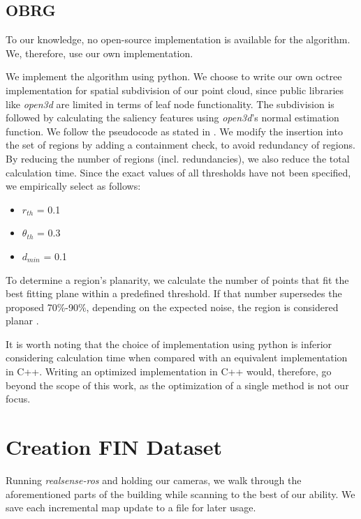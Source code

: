 \documentclass[main.tex]{subfiles}
\begin{document}
\subsection{OBRG}
To our knowledge, no open-source implementation is available for the algorithm.
We, therefore, use our own implementation.

We implement the algorithm using python. We choose to write our own octree implementation for spatial subdivision of our point cloud, since
public libraries like \textit{open3d} are limited in terms of leaf node functionality.
The subdivision is followed by calculating the saliency features using \textit{open3d}'s normal estimation function.
We follow the pseudocode as stated in \cite[Algorithm~1]{Vo_Truong-Hong_Laefer_Bertolotto_2015}. We modify the insertion into the set
of regions by adding a containment check, to avoid redundancy of regions. By reducing the number of regions (incl. redundancies), we also
reduce the total calculation time.
Since the exact values of all thresholds have not been specified, we empirically select as follows:

\begin{itemize}
    \item $r_{th}$ = 0.1 
    \item $\theta_{th}$ = 0.3
    \item $d_{min}$ =  0.1
\end{itemize}

To determine a region's planarity, we calculate the number of points that fit the best fitting plane within a predefined threshold. 
If that number supersedes the proposed 70\%-90\%, depending on the expected noise, the region is considered planar \cite[Section~3.4]{Vo_Truong-Hong_Laefer_Bertolotto_2015}.

It is worth noting that the choice of implementation using python is inferior considering calculation time when compared with an equivalent implementation in C++. Writing an optimized implementation in C++ would, therefore, go beyond the scope of this work, as the optimization of
a single method is not our focus. 

\section{Creation FIN Dataset}
\label{sec:finimpl}

Running \textit{realsense-ros} and holding our cameras, we walk through the aforementioned parts of the building while scanning to the best of our ability.
We save each incremental map update to a file for later usage.
\end{document}
